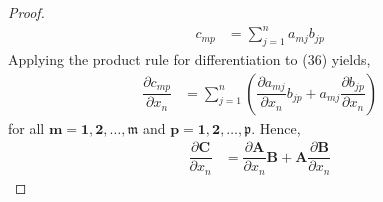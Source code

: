 \documentclass[14pt]{extarticle}
\begin{document}
\begin{flushleft}
\begin{large}
\begin{proof}
\begin{align}
c_{mp} &= \sum_{j=1}^{n}a_{mj}b_{jp}
\end{align}
Applying the product rule for differentiation to (36) yields,
\begin{align}
\dfrac{\partial c_{mp}}{\partial x_n} &= \sum_{j=1}^{n}\left(\dfrac{\partial a_{mj}}{\partial x_n} b_{jp} + a_{mj} \dfrac{\partial b_{jp}}{\partial x_n}\right)
\end{align}
for all $\mathbf{m = 1,2,\ldots,\mathfrak{m}}$ and $\mathbf{p = 1,2,\ldots,\mathfrak{p}}$. Hence,
\begin{align}
\dfrac{\partial \mathbf{C}}{\partial x_n} &= \dfrac{\partial \mathbf{A}}{\partial x_n}\mathbf{B} + \mathbf{A}\dfrac{\partial \mathbf{B}}{\partial x_n}
\end{align}
\end{proof}
\\
\end{large}
\end{flushleft}
\end{document}
